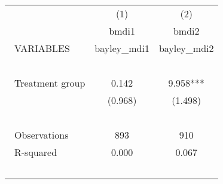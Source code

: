 \documentclass[]{article}
\begin{document}
\begin{tabular}{lcc} \hline
 & (1) & (2) \\\
 & bmdi1 & bmdi2 \\\
VARIABLES & bayley\_mdi1 & bayley\_mdi2 \\\ \hline
 &  &  \\\
Treatment group & 0.142 & 9.958*** \\\
 & (0.968) & (1.498) \\\
 &  &  \\\
Observations & 893 & 910 \\\
 R-squared & 0.000 & 0.067 \\\ \hline
\end{tabular}
\end{document}
